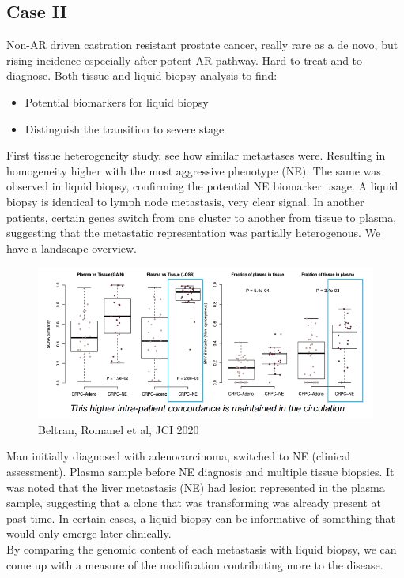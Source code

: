 \subsection{Case II}
Non-AR driven castration resistant prostate cancer, really rare as a de novo, but rising incidence especially after potent AR-pathway. Hard to treat and to diagnose.
Both tissue and liquid biopsy analysis to find:
\begin{itemize}
\item Potential biomarkers for liquid biopsy
\item Distinguish the transition to severe stage
\end{itemize}

First tissue heterogeneity study, see how similar metastases were. Resulting in homogeneity higher with the most aggressive phenotype (NE). The same was observed in liquid biopsy, confirming the potential NE biomarker usage. A liquid biopsy is identical to lymph node metastasis, very clear signal. In another patients, certain genes switch from one cluster to another from tissue to plasma, suggesting that the metastatic representation was partially heterogenous. We have a landscape overview.

\begin{figure}[H]
\centering
    \includegraphics[width=0.7\linewidth]{case2.png}
    \caption{\label{fig:case2}Beltran, Romanel et al, JCI 2020}
\end{figure}

Man initially diagnosed with adenocarcinoma, switched to NE (clinical assessment). Plasma sample before NE diagnosis and multiple tissue biopsies. It was noted that the liver metastasis (NE) had lesion represented in the plasma sample, suggesting that a clone that was transforming was already present at past time. In certain cases, a liquid biopsy can be informative of something that would only emerge later clinically. \\

By comparing the genomic content of each metastasis with liquid biopsy, we can come up with a measure of the modification contributing more to the disease.


